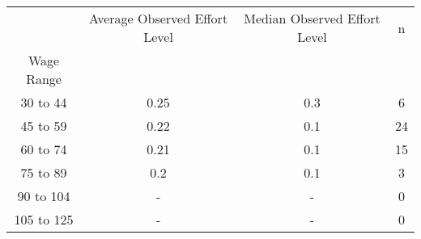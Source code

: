 \begin{tabular}{cccc}
\toprule
{} & Average Observed Effort Level & Median Observed Effort Level &   n \\
Wage Range &                               &                              &     \\
\midrule
30 to 44   &                          0.25 &                          0.3 &   6 \\
45 to 59   &                          0.22 &                          0.1 &  24 \\
60 to 74   &                          0.21 &                          0.1 &  15 \\
75 to 89   &                           0.2 &                          0.1 &   3 \\
90 to 104  &                             - &                            - &   0 \\
105 to 125 &                             - &                            - &   0 \\
\bottomrule
\end{tabular}
